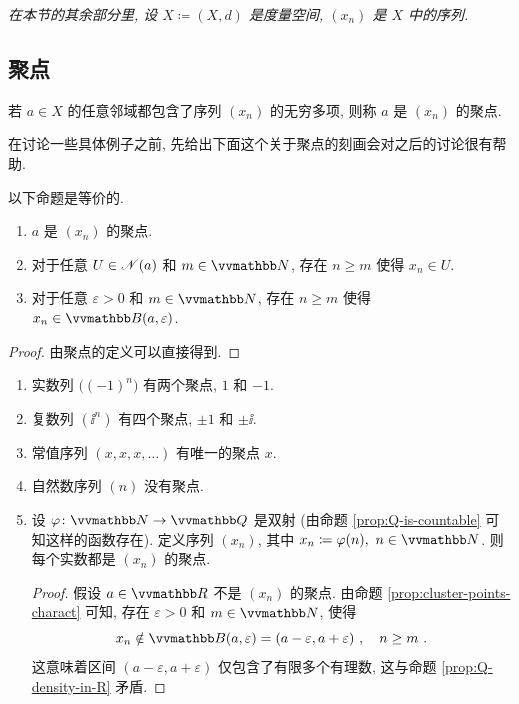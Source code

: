 \begin{center}
    \textsl{在本节的其余部分里, 设 \(X \coloneqq (X, d)\) 是度量空间, \((x_n)\) 是 \(X\) 中的序列.}
\end{center}

\subsection{聚点}

\begin{definition}[聚点]
    若 \(a \in X\) 的任意邻域都包含了序列 \((x_n)\) 的无穷多项, 则称 \(a\) 是 \((x_n)\) 的聚点.
\end{definition}

在讨论一些具体例子之前, 先给出下面这个关于聚点的刻画会对之后的讨论很有帮助.

\begin{proposition}\label{prop:cluster-points-charact}
    以下命题是等价的.
    \begin{enumerate}
        \item \(a\) 是 \((x_n)\) 的聚点.
        \item 对于任意 \(U \in \mathscr N(a)\) 和 \(m \in \N\), 存在 \(n \geq m\) 使得 \(x_n \in U\).
        \item 对于任意 \(\varepsilon > 0\) 和 \(m \in \N\), 存在 \(n \geq m\) 使得 \(x_n \in \B(a, \varepsilon)\).
    \end{enumerate}
\end{proposition}

\begin{proof}
    由聚点的定义可以直接得到.
\end{proof}

\begin{example}
    \begin{enumerate}
        \item 实数列 \(\bigl((- 1)^n\bigr)\) 有两个聚点, \(1\) 和 \(- 1\).
        \item 复数列 \((\ii^n)\) 有四个聚点, \(\pm 1\) 和 \(\pm \ii\).
        \item 常值序列 \((x, x, x, \ldots)\) 有唯一的聚点 \(x\).
        \item 自然数序列 \((n)\) 没有聚点.
        \item 设 \(\varphi \colon \N \to \Q\) 是双射 (由命题 \ref{prop:Q-is-countable} 可知这样的函数存在). 定义序列 \((x_n)\), 其中 \(x_n \coloneqq \varphi(n),\ n \in \N\). 则每个实数都是 \((x_n)\) 的聚点.
        \begin{proof}
            假设 \(a \in \R\) 不是 \((x_n)\) 的聚点. 由命题 \ref{prop:cluster-points-charact} 可知, 存在 \(\varepsilon > 0\) 和 \(m \in \N\), 使得
            \[
                x_n \notin \B(a, \varepsilon) = (a - \varepsilon, a + \varepsilon)\ ,\quad n \geq m\ .
            \]
            这意味着区间 \((a - \varepsilon, a + \varepsilon)\) 仅包含了有限多个有理数, 这与命题 \ref{prop:Q-density-in-R} 矛盾.
        \end{proof}
    \end{enumerate}
\end{example}

